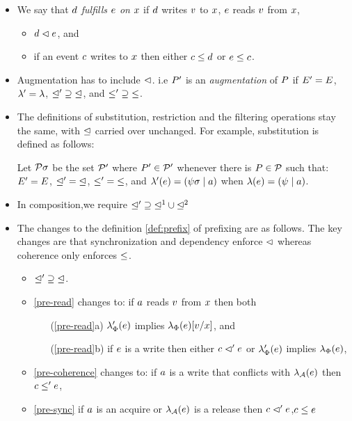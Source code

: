 \begin{itemize}
\item
  We say that $d$ \emph{fulfills $e$ on $x$} if $d$ writes
  $v$ to $x$, $e$ reads $v$ from $x$,
  \begin{itemize}
  \item $d \vartriangleleft e$, and
  \item if an event $c$ writes to $x$ then either $c \leq d$ or $e \leq c$.
  \end{itemize}

\item 
Augmentation has to include ${\vartriangleleft}$. i.e 
$P'$ is an \emph{augmentation} of $P$ if $E'=E$,
  ${\lambda'}={\lambda}$, ${\trianglelefteq'}\supseteq{\trianglelefteq}$, and
  ${\leq'}\supseteq{\leq}$.

\item The definitions of substitution, restriction and the filtering
  operations  stay the same, with $\trianglelefteq$ carried over unchanged.  For
  example, substitution is defined as follows:

Let $\mathcal{P}\sigma$ be the set $\mathcal{P}'$ where $P'\in\mathcal{P}'$ whenever
there is $P\in\mathcal{P}$ such that:
$E' = E$,
${\trianglelefteq'} = {\trianglelefteq}$, 
${\leq'} = {\leq}$,
and
$\lambda'(e) = (\psi\sigma \mid a)$ when $\lambda(e) = (\psi \mid a)$.


\item In composition,we require ${\trianglelefteq'}\supseteq{\trianglelefteq^1}\cup{\trianglelefteq^2}$

\item The changes to the definition \ref{def:prefix} of prefixing are as follows.  The key changes are that synchronization and dependency enforce $\vartriangleleft$ whereas coherence only enforces $\leq$. 
\begin{itemize}
\item ${\trianglelefteq'}\supseteq{\trianglelefteq}$.

\item \ref{pre-read} changes to: if $a$ reads $v$ from $x$ then both
  \begin{enumerate}
  \item[(\ref{pre-read}a)] $\lambda_{\Phi}'(e)$ implies $\lambda_{\Phi}(e)[v/x]$, and
  \item[(\ref{pre-read}b)] if $e$ is a write then either $c\vartriangleleft'e$
    or $\lambda_{\Phi}'(e)$ implies $\lambda_{\Phi}(e)$,
  \end{enumerate}

\item \ref{pre-coherence} changes to:
 if $a$ is a write that conflicts with $\lambda_{\mathcal{A}}(e)$ 
    then $c \leq' e$,

\item \ref{pre-sync} if $a$ is an acquire or $\lambda_{\mathcal{A}}(e)$ is a release then $c \vartriangleleft' e$,$c \leq e$
\end{itemize}
\end{itemize}

